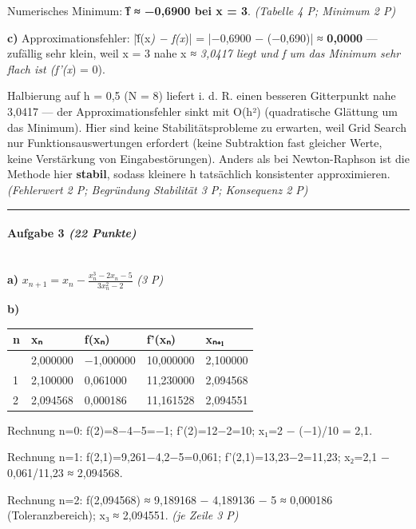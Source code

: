 \documentclass[11pt, a4paper]{article}
\begin{document}
Numerisches Minimum: \textbf{f̃ ≈ −0,6900 bei x = 3}. \textit{(Tabelle 4 P; Minimum 2 P)}


\textbf{c)} Approximationsfehler: |f̃(x\textit{) − f(x})| = |−0,6900 − (−0,690)| ≈ \textbf{0,0000} — zufällig sehr klein, weil x = 3 nahe x\textit{ ≈ 3,0417 liegt und f um das Minimum sehr flach ist (f'(x}) = 0).


Halbierung auf h = 0,5 (N = 8) liefert i. d. R. einen besseren Gitterpunkt nahe 3,0417 — der Approximationsfehler sinkt mit O(h²) (quadratische Glättung um das Minimum). Hier sind keine Stabilitätsprobleme zu erwarten, weil Grid Search nur Funktionsauswertungen erfordert (keine Subtraktion fast gleicher Werte, keine Verstärkung von Eingabestörungen). Anders als bei Newton-Raphson ist die Methode hier \textbf{stabil}, sodass kleinere h tatsächlich konsistenter approximieren. \textit{(Fehlerwert 2 P; Begründung Stabilität 3 P; Konsequenz 2 P)}



\noindent\textcolor{rulegray}{\rule{\linewidth}{0.4pt}}


\paragraph{Aufgabe 3 \textit{(22 Punkte)}}\mbox{}\\[2pt]

\textbf{a)} $x_{n+1} = x_n - \frac{x_n^3 - 2x_n - 5}{3x_n^2 - 2}$ \textit{(3 P)}


\textbf{b)}



{\small
\begin{tabularx}{\linewidth}{XXXXX}
\hline
\rowcolor{tableheadbg}
{\color{white}\textbf{n}} & {\color{white}\textbf{xₙ}} & {\color{white}\textbf{f(xₙ)}} & {\color{white}\textbf{f'(xₙ)}} & {\color{white}\textbf{xₙ₊₁}} \\[2pt]
\hline
\endhead
\hline
\endfoot
0 & 2,000000 & −1,000000 & 10,000000 & 2,100000 \\
1 & 2,100000 & 0,061000 & 11,230000 & 2,094568 \\
2 & 2,094568 & 0,000186 & 11,161528 & 2,094551 \\
\end{tabularx}
}


Rechnung n=0: f(2)=8−4−5=−1; f'(2)=12−2=10; x₁=2 − (−1)/10 = 2,1.

Rechnung n=1: f(2,1)=9,261−4,2−5=0,061; f'(2,1)=13,23−2=11,23; x₂=2,1 − 0,061/11,23 ≈ 2,094568.

Rechnung n=2: f(2,094568) ≈ 9,189168 − 4,189136 − 5 ≈ 0,000186 (Toleranzbereich); x₃ ≈ 2,094551. \textit{(je Zeile 3 P)}
\end{document}
